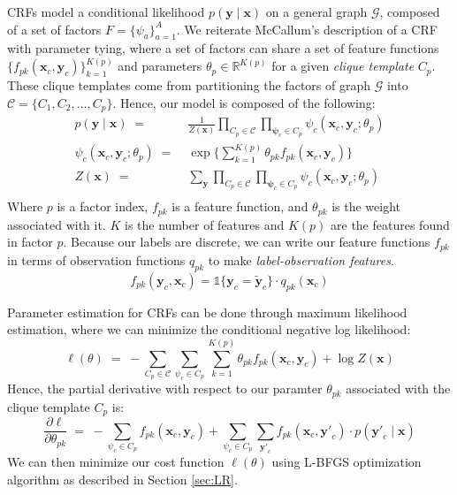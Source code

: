 \documentclass{article}
\begin{document}
CRFs model a conditional likelihood $p(\mathbf{y} \mid \mathbf{x})$ on a general
graph $\mathcal{G}$, composed of a set of factors
$F = \{ \psi_a \} _{a=1}^{A}$. We reiterate McCallum's description
of a CRF with parameter tying, where a set of factors can share a set of feature
functions $\{f_{pk}\left(\mathbf{x}_c, \mathbf{y}_c \right)\}_{k=1}^{K(p)}$ and
parameters $\theta_p \in \mathbb{R}^{K(p)}$ for a given \textit{clique template}
$C_p$. These clique templates come from partitioning the factors of graph
$\mathcal{G}$ into $\mathcal{C} = \{C_1, C_2, \hdots, C_p \}$. Hence, our model
is composed of the following:
\begin{equation}
  \begin{aligned}
    p(\mathbf{y} \mid \mathbf{x}) \; = \; & \frac{1}{Z(\mathbf{x})} \prod_{C_p \in \mathcal{C}} \prod_{\mathbf{\psi}_c \in C_p} \psi_c (\mathbf{x}_c, \mathbf{y}_c ; \theta_p) \\
    \psi_c (\mathbf{x}_c, \mathbf{y}_c ; \theta_p ) \; = \; & \exp \Bigg\{ \sum_{k=1}^{K(p)} \theta_{pk} f_{pk} (\mathbf{x}_c, \mathbf{y}_c) \Bigg\} \\
    Z(\mathbf{x}) \; = \; & \sum_{\mathbf{y}} \prod_{C_p \in \mathcal{C}} \prod_{\mathbf{\psi}_c \in C_p} \psi_c (\mathbf{x}_c, \mathbf{y}_c ; \theta_p) \\
  \end{aligned}
\end{equation}
Where $p$ is a factor index, $f_{pk}$ is a feature function, and $\theta_{pk}$ is the
weight associated with it. $K$ is the number of features and $K(p)$ are the
features found in factor $p$.
Because our labels are discrete, we can write our
feature functions $f_{pk}$ in terms of observation functions $q_{pk}$ to make
\textit{label-observation features}.
\begin{equation}
  f_{pk} (\mathbf{y}_c, \mathbf{x}_c) = \mathds{1} \{\mathbf{y}_c = \mathbf{\widetilde{y}}_c\} \cdot q_{pk}(\mathbf{x}_c)
\end{equation}

Parameter estimation for CRFs can be done through maximum likelihood estimation,
where we can minimize the conditional negative log likelihood:
\begin{equation}
  \ell (\theta) \; = \; - \sum_{C_p \in \mathcal{C}} \sum_{\psi_c \in C_p} \sum_{k=1}^{K(p)} \theta_{pk} f_{pk} (\mathbf{x}_c, \mathbf{y}_c) + \log Z(\mathbf{x})
\end{equation}
Hence, the partial derivative with respect to our paramter $\theta_{pk}$ associated
with the clique template $C_p$ is:
\begin{equation}
  \frac{\partial \ell}{\partial \theta_{pk}} \; = \; - \sum_{\psi_c \in C_p} f_{pk} (\mathbf{x}_c, \mathbf{y}_c) + \sum_{\psi_c \in C_p} \sum_{\mathbf{y'}_c} f_{pk} (\mathbf{x}_c, \mathbf{y'}_c) \cdot p(\mathbf{y'}_c \mid \mathbf{x})
\end{equation}
We can then minimize our cost function $\ell(\theta)$ using L-BFGS optimization
algorithm as described in Section \ref{sec:LR}.
\end{document}
